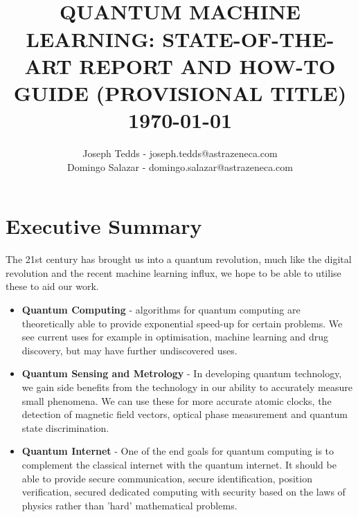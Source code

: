\documentclass{article}
\title{
			\HRule{0.5pt} \\						%
			\LARGE \textbf{\uppercase{Quantum Machine Learning: State-of-the-Art Report and How-to Guide (Provisional Title)}}	%
			\HRule{2pt} \\ [0.5cm]		%
			\normalsize \today			%
		}
\author{Joseph Tedds - joseph.tedds@astrazeneca.com \\
 Domingo Salazar - domingo.salazar@astrazeneca.com}
\theoremstyle{definition}
\begin{document}
\maketitle
\clearpage



\section{Executive Summary}
The 21st century has brought us into a quantum revolution, much like the digital revolution and the recent machine learning influx, we hope to be able to utilise these to aid our work.

\begin{itemize}
\item \textbf{Quantum Computing} - algorithms for quantum computing are theoretically able to provide exponential speed-up for certain problems. We see current uses for example in optimisation, machine learning and drug discovery, but may have further undiscovered uses.
\item \textbf{Quantum Sensing and Metrology} - In developing quantum technology, we gain side benefits from the technology in our ability to accurately measure small phenomena. We can use these for more accurate atomic clocks, the detection of magnetic field vectors, optical phase measurement and quantum state discrimination. 
\item \textbf{Quantum Internet} - One of the end goals for quantum computing is to complement the classical internet with the quantum internet. It should be able to provide secure communication, secure identification, position verification, secured dedicated computing with security based on the laws of physics rather than 'hard' mathematical problems.
\end{itemize}
\end{document}
